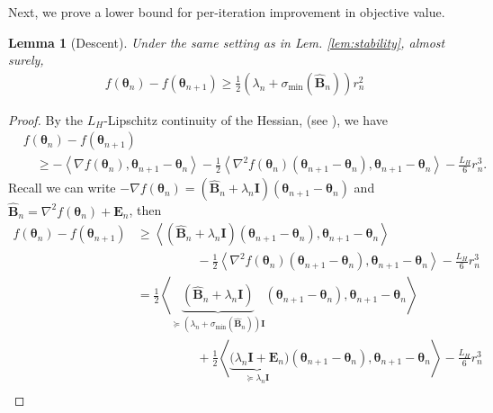 \documentclass[11pt]{amsart}
\theoremstyle{plain}
\newtheorem{lemma}[theorem]{Lemma}
\theoremstyle{definition}
\theoremstyle{remark}
\def\bE{\mathbf{E}}
\def\H{\mathbf{H}}
\def\I{\mathbf{I}}
\def\eps{\varepsilon}
\def\B{\mathbf{B}}
\def\param{\boldsymbol{\theta}}
\def\I{\mathbf{I}}
\newcommand{\innp}[1]{\left\langle #1 \right\rangle}
\newcommand{\commHL}[1]{{\textcolor{blue}{#1}}}
\begin{document}
Next, we prove a lower bound for per-iteration improvement in objective value. 

\begin{lemma}[Descent]\label{lem:descent}  
	Under the same setting as in Lem. \ref{lem:stability}, almost surely,
	\begin{align}\label{eq:perstep_impv}
		f(\param_n)-f(\param_{n+1})\geq 		
                \frac{1}{2}(\lambda_n+\sigma_{\min}(\hat{\B}_{n})) r_{n}^{2} 
	\end{align}
\end{lemma}
\begin{proof}    
    By the $L_{H}$-Lipschitz continuity of the Hessian, %
    (see \cite{nesterov2006cubic}), we have
	\begin{align*}
		&f(\param_n)-f(\param_{n+1}) \\
        &\quad \geq -\innp{\nabla f(\param_n),\param_{n+1}-\param_{n}}-\frac{1}{2}\innp{\nabla^2f(\param_n)(\param_{n+1}-\param_n),\param_{n+1}-\param_n}-\frac{L_H}{6}r_n^3.
	\end{align*}
   Recall we can write $-\nabla f(\param_n)=(\hat{\B}_n+\lambda_n\mathbf{I})(\param_{n+1}-\param_n)$ and $\hat{\B}_n=\nabla^{2}f(\param_{n})+\bE_{n}$, then
	\begin{align*}
		f(\param_n)-f(\param_{n+1}) &\geq \innp{(\hat{\B}_n+\lambda_n\mathbf{I})(\param_{n+1}-\param_n),\param_{n+1}-\param_{n}} \\
        & \hspace{2cm} -\frac{1}{2}\innp{\nabla^2f(\param_n)(\param_{n+1}-\param_n),\param_{n+1}-\param_n}-\frac{L_H}{6}r_n^3\\
		&=\frac{1}{2}\innp{ \underbrace{(\hat{\B}_n+\lambda_n\mathbf{I})}_{\succeq {(\lambda_n+\sigma_{\min}({\hat{\B}_{n}}))}\mathbf{I}}(\param_{n+1}-\param_n),\param_{n+1}-\param_{n}} \\
        &\hspace{2cm} +\frac{1}{2}\innp{ \underbrace{(\lambda_{n}\I +\bE_{n}}_{\succeq {\lambda_n}\mathbf{I}} )(\param_{n+1}-\param_n),\param_{n+1}-\param_n}-\frac{L_H}{6}r_n^3\\

\end{align*}
\end{proof}
\end{document}
